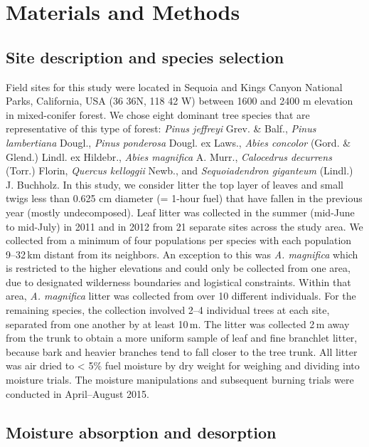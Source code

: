 \documentclass[fire,article,submit,moreauthors,pdftex]{Definitions/mdpi}
\begin{document}
\section{Materials and Methods}

\subsection{Site description and species selection}

Field sites for this study were located in Sequoia and Kings Canyon National Parks, California, USA (36 36N, 118 42 W) between 1600 and 2400 m elevation in mixed-conifer forest. We chose eight dominant tree species that are representative of this type of forest: \emph{Pinus jeffreyi} Grev. \& Balf., \emph{Pinus lambertiana} Dougl., \emph{Pinus ponderosa} Dougl. ex Laws., \emph{Abies concolor} (Gord. \& Glend.) Lindl. ex Hildebr., \emph{Abies magnifica} A. Murr., \emph{Calocedrus decurrens} (Torr.) Florin, \emph{Quercus kelloggii} Newb., and \emph{Sequoiadendron giganteum} (Lindl.) J. Buchholz. In this study, we consider litter the top layer of leaves and small twigs less than 0.625 cm diameter (= 1-hour fuel) that have fallen in the previous year (mostly undecomposed). Leaf litter was collected in the summer (mid-June to mid-July) in 2011 and in 2012 from 21 separate sites across the study area. We collected from a minimum of four populations per species with each population 9--32\,km distant from its neighbors. An exception to this was \emph{A. magnifica} which is restricted to the higher elevations and could only be collected from one area, due to designated wilderness boundaries and logistical constraints. Within that area, \emph{A. magnifica} litter was collected from over 10 different individuals. For the remaining species, the collection involved 2--4 individual trees at each site, separated from one another by at least 10\,m. The litter was collected 2\,m away from the trunk to obtain a more uniform sample of leaf and fine branchlet litter, because bark and heavier branches tend to fall closer to the tree trunk. All litter was air dried to < 5\% fuel moisture by dry weight for weighing and dividing into moisture trials. The moisture manipulations and subsequent burning trials were conducted in April--August 2015.

\subsection{Moisture absorption and desorption}
\end{document}
